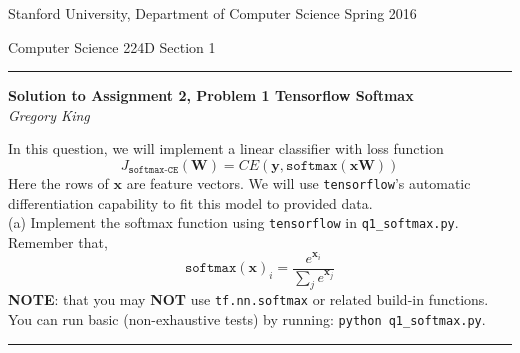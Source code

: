 \documentclass[letter,12pt]{article}
\newcommand{\myheader}[4]
{\vspace*{-0.5in}
\noindent
{#1} \hfill {#3}

\noindent
{#2} \hfill {#4}

\noindent
\rule[8pt]{\textwidth}{1pt}

\vspace{1ex} 
}  %
\newcommand{\myalgsheader}[0]
{\myheader{Stanford University, Department of Computer Science}
{Computer Science 224D}{Spring 2016}{Section 1}}
\newcommand{\myhwtitle}[3]
{\begin{center}
{\large {\bf Solution to Assignment {#1}, Problem {#2}}}\\
\medskip 
{\it {#3}} %
\end{center}}
\begin{document}
\myalgsheader

\pagestyle{plain}
\setcounter{page}{1}
\myhwtitle{2}{1 {\bf Tensorflow Softmax}}{Gregory King}

\bigskip

\noindent In this question, we will implement a linear classifier with loss function\\
\begin{equation}
J_{\texttt{softmax-CE}}({\textbf{W}}) = CE({\boldsymbol y}, \texttt{softmax}({\boldsymbol x}\textbf{W}))
\end{equation}
Here the rows of ${\boldsymbol x}$ are feature vectors. We will use \texttt{tensorflow}'s automatic
differentiation capability to fit this model to provided data.\\

\noindent (a) Implement the softmax function using \texttt{tensorflow} in \texttt{q1\_softmax.py}. Remember that,\\
\begin{equation}
\texttt{softmax}({\boldsymbol x})_{i} = \frac{e^{{\boldsymbol x}_{i}}}{\sum_{j} e^{{\boldsymbol x}_j}}
\end{equation}
\textbf{NOTE}: that you may \textbf{NOT} use \texttt{tf.nn.softmax} or related build-in functions. You can run basic (non-exhaustive tests) by running: \texttt{python q1\_softmax.py}.\\
\vspace{5mm}
\noindent\rule{\textwidth}{0.4pt}\vspace{5mm}
\end{document}
